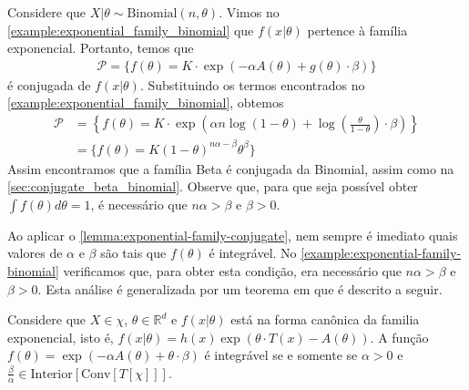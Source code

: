 \begin{example}
 \label{example:exponential-family-binomial}
 Considere que
 $X|\theta \sim \text{Binomial}(n,\theta)$.
 Vimos no \cref{example:exponential_family_binomial}
 que $f(x|\theta)$ pertence à família exponencial.
 Portanto, temos que
 \begin{align*}
  \mathcal{P} = \{f(\theta) =K
  \cdot \exp\left(-\alpha A(\theta)
  +g(\theta) \cdot \beta \right) \}
 \end{align*}
 é conjugada de $f(x|\theta)$.
 Substituindo os termos encontrados no
 \cref{example:exponential_family_binomial}, obtemos
 \begin{align*}
  \mathcal{P} &= \left\{f(\theta) = K \cdot \exp\left(\alpha n\log(1-\theta) +\log\left(\frac{\theta}{1-\theta}\right) \cdot \beta \right) \right\} \\
  &= \{f(\theta) = K(1-\theta)^{n\alpha-\beta} \theta^{\beta} \}
 \end{align*}
 Assim encontramos que a família Beta é
 conjugada da Binomial, assim como na
 \cref{sec:conjugate_beta_binomial}.
 Observe que, para que seja possível obter
 $\int{f(\theta)d\theta}=1$, é necessário que
 $n\alpha > \beta$ e $\beta > 0$. 
\end{example}

Ao aplicar o \cref{lemma:exponential-family-conjugate},
nem sempre é imediato quais valores de
$\alpha$ e $\beta$ são tais que
$f(\theta)$ é integrável.
No \cref{example:exponential-family-binomial}
verificamos que, para obter esta condição, era
necessário que $n\alpha > \beta$ e $\beta > 0$.
Esta análise é generalizada por um teorema em \citet{Diaconis1979} que é descrito a seguir.

\begin{theorem}
 \label{theorem:exponencial-propriety}
 Considere que $X \in \chi$,
 $\theta \in \mathbb{R}^{d}$ e
 $f(x|\theta)$ está na forma canônica da
 familia exponencial, isto é,
 $f(x|\theta) = h(x) \exp\left(\theta \cdot T(x) - A(\theta)\right)$.
 A função $f(\theta) = \exp\left(-\alpha A(\theta) +\theta \cdot \beta \right)$
 é integrável se e somente se $\alpha > 0$ e
 $\frac{\beta}{\alpha} \in \text{Interior}[\text{Conv}[T[\chi]]]$.
\end{theorem}

